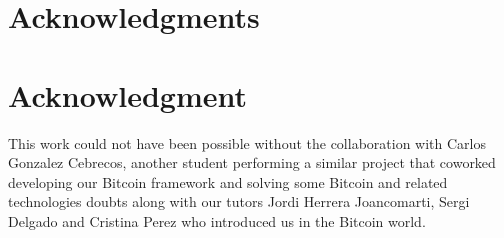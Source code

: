 \documentclass[12pt,journal,compsoc]{IEEEtran}
\begin{document}



\ifCLASSOPTIONcompsoc
  \section*{Acknowledgments}
\else
  \section*{Acknowledgment}
\fi


This work could not have been possible without the collaboration with Carlos Gonzalez Cebrecos, another student performing a similar project that coworked developing our Bitcoin framework and solving some Bitcoin and related technologies doubts along with our tutors Jordi Herrera Joancomarti, Sergi Delgado and Cristina Perez who introduced us in the Bitcoin world.


\ifCLASSOPTIONcaptionsoff
  \newpage
\fi




\end{document}
